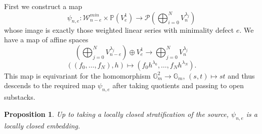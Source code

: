 \documentclass[a4paper,12pt]{amsart}
\newtheorem{prop}[thm]{Proposition}
\theoremstyle{definition}
\newcommand{\bP}{\mathbb{P}}
\newcommand{\cW}{\mathcal{W}}
\newcommand{\cP}{\mathcal{P}}
\begin{document}
	First we construct a map
	$$
	\psi_{n,e} : \cW_{n-e}^{min} \times \bP(V_e^1) \to \cP\left(\bigoplus_{i = 0}^N V_n^{\lambda_j}\right)
	$$
	whose image is exactly those weighted linear series with minimality defect $e$. We have a map of affine spaces
	$$
	\left(\bigoplus_{j = 0}^N V_{n-e}^{\lambda_j}\right) \oplus V_e^1 \to \bigoplus_{j = 0}^N V_n^{\lambda_j}
	$$
	$$
	((f_0, \ldots, f_N), h) \mapsto (f_0h^{\lambda_0}, \ldots, f_N h^{\lambda_N}). 
	$$
	This map is equivariant for the homomorphism $\mathbb{G}_m^2 \to \mathbb{G}_m$, $(s,t) \mapsto st$ and thus descends to the required map $\psi_{n,e}$ after taking quotients and passing to open substacks. 
	
	\begin{prop}\label{prop:loc:closed}
		Up to taking a locally closed stratification of the source, $\psi_{n,e}$ is a locally closed embedding. 
	\end{prop}
\end{document}
